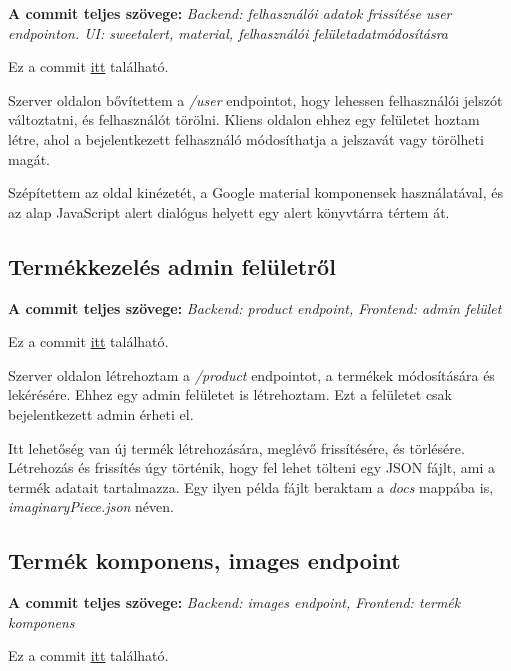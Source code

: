 \documentclass[]{article}
\begin{document}
\noindent
\textbf{A commit teljes szövege:} \textit{Backend: felhasználói adatok frissítése user endpointon. UI: sweetalert, material, felhasználói felületadatmódosításra}

\bigskip
\noindent
Ez a commit \href{https://github.com/Gtomika/prf-project/commit/6794668ee38e4793fa249915b7df71481f39e519}{itt} található.
\bigskip

Szerver oldalon bővítettem a \textit{/user} endpointot, hogy lehessen felhasználói jelszót változtatni, és felhasználót törölni. Kliens oldalon ehhez egy felületet hoztam létre, ahol a bejelentkezett felhasználó módosíthatja a jelszavát vagy törölheti magát.

Szépítettem az oldal kinézetét, a Google material komponensek használatával, és az alap JavaScript alert dialógus helyett egy alert könyvtárra tértem át.

\subsection{Termékkezelés admin felületről}

\noindent
\textbf{A commit teljes szövege:} \textit{Backend: product endpoint, Frontend: admin felület}

\bigskip
\noindent
Ez a commit \href{https://github.com/Gtomika/prf-project/commit/f592c43be14ac39f53c4aa99b7b46c60c5b0640c}{itt} található.
\bigskip

Szerver oldalon létrehoztam a \textit{/product} endpointot, a termékek módosítására és lekérésére. Ehhez egy admin felületet is létrehoztam. Ezt a felületet csak bejelentkezett admin érheti el. 

Itt lehetőség van új termék létrehozására, meglévő frissítésére, és törlésére. Létrehozás és frissítés úgy történik, hogy fel lehet tölteni egy JSON fájlt, ami a termék adatait tartalmazza. Egy ilyen példa fájlt beraktam a \textit{docs} mappába is, \textit{imaginaryPiece.json} néven.

\subsection{Termék komponens, images endpoint}

\noindent
\textbf{A commit teljes szövege:} \textit{Backend: images endpoint, Frontend: termék komponens}

\bigskip
\noindent
Ez a commit \href{https://github.com/Gtomika/prf-project/commit/d57c3f971a6aa08f9c6dffd355d62fdd5254c3b3}{itt} található.
\bigskip
\end{document}
